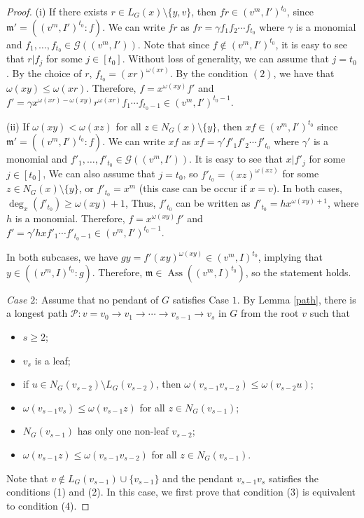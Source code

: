 \documentclass[12pt,amscd]{amsart}
\DeclareMathOperator{\ass}{Ass}
\theoremstyle{definition}
\def\P{{\mathcal P}}
\def\m {\mathfrak m}
\begin{document}
\begin{proof}
(i) If there exists $r\in L_G(x)\setminus\{y,v\}$, then $fr\in (v^m, I')^{t_0}$, since $\m' = ((v^m,I')^{t_0}\colon f)$.
We can write $fr$ as $fr = \gamma f_1f_2\cdots f_{t_0}$ where $\gamma$ is a monomial and $f_1,\ldots,f_{t_0}\in \mathcal{G}((v^m,I'))$. Note that since $f\notin (v^m,I')^{t_0}$, it is easy to see  that $r|f_j$ for some $j\in [t_0]$.
Without loss of generality, we can assume that $j=t_0$. By the choice of $r$,  $f_{t_0} = (xr)^{\omega(xr)}$. By the condition $(2)$, we have that  $\omega(xy) \leqslant \omega(xr)$. Therefore, $f = x^{\omega(xy)}f'$ and
$f' = \gamma x^{\omega(xr)-\omega(xy)}r^{\omega(xr)} f_1\cdots f_{t_0-1}\in (v^m,I')^{t_0-1}$.

(ii) If $\omega(xy) < \omega(xz)$ for all $z\in N_G(x)\setminus \{y\}$, then $xf\in  (v^m, I')^{t_0}$ since $\m' = ((v^m,I')^{t_0}\colon f)$. We can write $xf$ as $xf= \gamma' f'_1f'_2\cdots f'_{t_0}$ where $\gamma'$ is a monomial and $f'_1,\ldots,f'_{t_0}\in \mathcal{G}((v^m,I'))$. It is easy to see that  $x| f'_j$ for some $j\in [t_0]$, We  can  also assume that $j=t_0$, so $f'_{t_0} = (xz)^{\omega(xz)}$ for some $z\in N_G(x)\setminus \{y\}$, or $f'_{t_0} = x^m$ (this  case can be  occur if $x=v$). In both cases,   $\deg_x(f'_{t_0})\geqslant \omega(xy)+1$, Thus,  $f'_{t_0}$ can be written as  $f'_{t_0} = hx^{\omega(xy)+1}$, where $h$ is a monomial. Therefore, $f = x^{\omega(xy)}f'$ and $f' = \gamma' h x f'_1\cdots f'_{t_0-1}\in (v^m,I')^{t_0-1}$.


In both subcases, we have $g y = f' (xy)^{\omega(xy)} \in (v^m, I)^{t_0}$,  implying that $y\in  ((v^m, I)^{t_0} : g)$.
Therefore, $\mathfrak{m} \in \ass((v^m, I)^{t_0})$,  so the statement holds.

{\it Case $2$}: Assume that no pendant of $G$  satisfies Case $1$. By Lemma \ref{path}, there is a longest path $\P: v= v_0\to v_1\to\cdots\to v_{s-1}\to v_s$ in $G$ from the root $v$ such that
\begin{itemize}
	\item[(5)] $s \geqslant 2$;
	\item[(6)] $v_s$ is a leaf;
	\item[(7)] if $u\in N_G(v_{s-2})\setminus L_G(v_{s-2})$, then $\omega(v_{s-1}v_{s-2})\leqslant \omega(v_{s-2}u)$;
	\item[(8)] $\omega(v_{s-1}v_s) \leqslant \omega(v_{s-1}z)$ for all $z\in N_G(v_{s-1})$;
	\item[(9)] $N_G(v_{s-1})$ has only one non-leaf $v_{s-2}$;
	\item[(10)] $\omega(v_{s-1}z) \leqslant \omega(v_{s-1}v_{s-2})$ for all $z\in N_G(v_{s-1})$.
\end{itemize}
Note that $v \notin L_G(v_{s-1}) \cup \{v_{s-1}\}$ and the pendant  $v_{s-1}v_s$ satisfies the  conditions (1) and (2). In this case, we first prove that condition (3) is equivalent to condition (4).


\end{proof}
\end{document}
